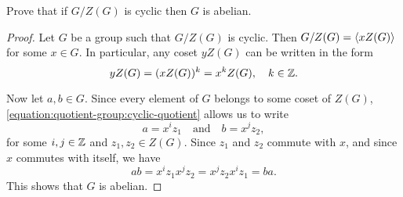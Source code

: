  Prove that if $G/Z(G)$ is cyclic then $G$ is abelian.
\begin{proof}
  Let $G$ be a group such that $G/Z(G)$ is cyclic. Then
  $G/Z(G) = \langle{xZ(G)}\rangle$ for some $x\in G$. In particular, any coset
  $yZ(G)$ can be written in the form
  \begin{equation}
    \label{equation:quotient-group:cyclic-quotient}
    yZ(G) = (xZ(G))^k = x^kZ(G),
    \quad k\in\mathbb{Z}.
  \end{equation}

  Now let $a,b\in G$. Since every element of $G$ belongs to some coset
  of $Z(G)$, \eqref{equation:quotient-group:cyclic-quotient} allows us
  to write
  \begin{equation*}
    a = x^iz_1
    \quad\text{and}\quad
    b = x^jz_2,
  \end{equation*}
  for some $i,j\in\mathbb{Z}$ and $z_1,z_2\in Z(G)$. Since $z_1$ and $z_2$
  commute with $x$, and since $x$ commutes with itself, we have
  \begin{equation*}
    ab = x^iz_1x^jz_2 = x^jz_2x^iz_1 = ba.
  \end{equation*}
  This shows that $G$ is abelian.
\end{proof}

